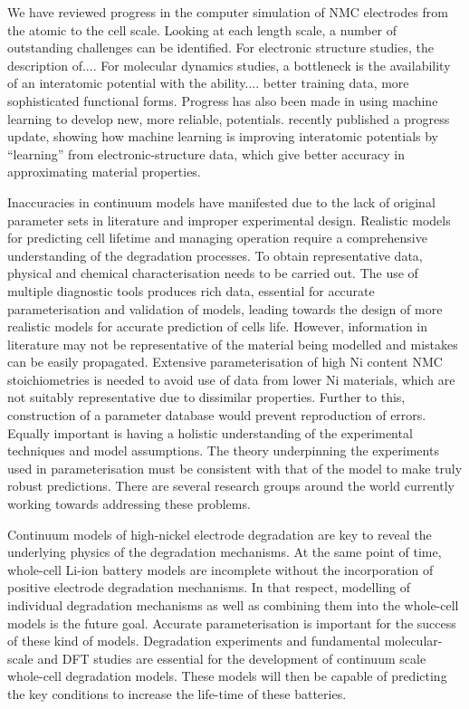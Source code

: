 \documentclass[journal=jacsat,manuscript=article]{achemso}
\begin{document}
We have reviewed progress in the computer simulation of NMC electrodes from the atomic to the cell scale. 
Looking at each length scale, a number of outstanding challenges can be identified.
%
For electronic structure studies, the description of....
%
For molecular dynamics studies, a bottleneck is the availability of an interatomic potential with the ability.... better training data, more sophisticated functional forms. Progress has also been made in using machine learning to develop new, more reliable, potentials. \citeauthor{deringer2019machine} recently published a progress update, showing how machine learning is improving interatomic potentials by ``learning'' from electronic-structure data, which give better accuracy in approximating material properties. \cite{deringer2019machine}

%
Inaccuracies in continuum models have manifested due to the lack of original parameter sets in literature and improper experimental design. Realistic models for predicting cell lifetime and managing operation require a comprehensive understanding of the degradation processes. To obtain representative data, physical and chemical characterisation needs to be carried out. The use of multiple diagnostic tools produces rich data, essential for accurate parameterisation and validation of models, leading towards the design of more realistic models for accurate prediction of cells life. However, information in literature may not be representative of the material being modelled and mistakes can be easily propagated.\cite{Howey_2020} Extensive parameterisation of high Ni content NMC stoichiometries is needed to avoid use of data from lower Ni materials, which are not suitably representative due to dissimilar properties. Further to this, construction of a parameter database would prevent reproduction of errors. Equally important is having a holistic understanding of the experimental techniques and model assumptions. The theory underpinning the experiments used in parameterisation must be consistent with that of the model to make truly robust predictions. There are several research groups around the world currently working towards addressing these problems.


Continuum models of high-nickel electrode degradation are key to reveal the underlying physics of the degradation mechanisms. At the same point of time, whole-cell Li-ion battery models are incomplete without the incorporation of positive electrode degradation mechanisms. In that respect, modelling of individual degradation mechanisms as well as combining them into the whole-cell models is the future goal. Accurate parameterisation is important for the success of these kind of models. Degradation experiments and fundamental molecular-scale and DFT studies are essential for the development of continuum scale whole-cell degradation models.\cite{Sulzer_2020} These models will then be capable of predicting the key conditions to increase the life-time of these batteries.
\end{document}
